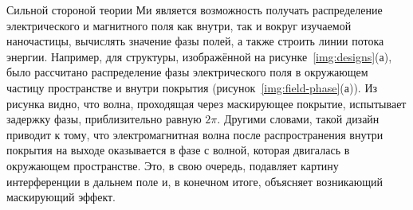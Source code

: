 Сильной стороной теории Ми является возможность получать распределение
электрического и магнитного поля как внутри, так и вокруг изучаемой
наночастицы, вычислять значение фазы полей, а также строить линии
потока энергии.  Например, для структуры, изображённой на
рисунке~\ref{img:designs}(а), было рассчитано распределение фазы
электрического поля в окружающем частицу пространстве и внутри
покрытия (рисунок~\ref{img:field-phase}(а)).  Из рисунка видно, что
волна, проходящая через маскирующее покрытие, испытывает задержку фазы,
приблизительно равную $2\pi$. Другими словами, такой дизайн приводит к
тому, что электромагнитная волна после распространения внутри покрытия
на выходе оказывается в фазе с волной, которая двигалась в окружающем
пространстве.  Это, в свою очередь, подавляет картину интерференции в
дальнем поле и, в конечном итоге, объясняет возникающий маскирующий
эффект.

\clearpage